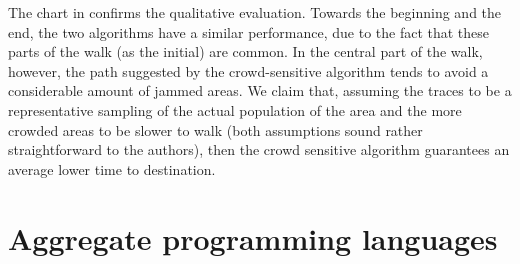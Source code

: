 \documentclass[12pt,a4paper,twoside,openright]{book}
\begin{document}
The chart in  confirms the qualitative evaluation.
%
Towards the beginning and the end, the two algorithms have a similar performance, due to the fact that these parts of the walk (as the initial) are common.
%
In the central part of the walk, however, the path suggested by the crowd-sensitive algorithm tends to avoid a considerable amount of jammed areas.
%
We claim that, assuming the traces to be a representative sampling of the actual population of the area and the more crowded areas to be slower to walk (both assumptions sound rather straightforward to the authors), then the crowd sensitive algorithm guarantees an average lower time to destination.

\part{Aggregate programming languages}



\end{document}
